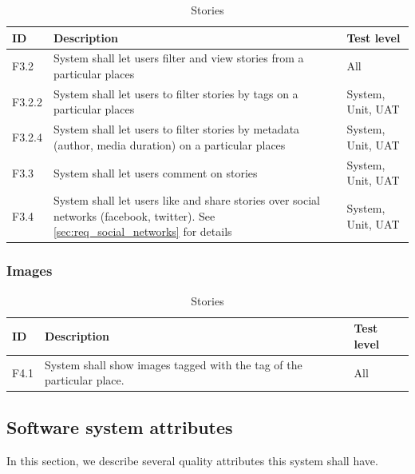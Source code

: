 \documentclass[11pt]{book}
\begin{document}
\begin{table}[H]
\centering
\begin{tabular}{ l  p{11cm} l }
    ID       & Description                                                                                              & Test level            \\ \hline
    F3.2     & System shall let users filter and view stories from a particular places                                  & All                   \\ \hline
    F3.2.2   & System shall let users to filter stories by tags on a particular places                                  & System, Unit, UAT     \\ \hline
    F3.2.4   & System shall let users to filter stories by metadata (author, media duration) on a particular places     & System, Unit, UAT     \\ \hline
    F3.3     & System shall let users comment on stories                                                                & System, Unit, UAT     \\ \hline
    F3.4     & System shall let users like and share stories over social networks (facebook, twitter). 
               See \ref{sec:req_social_networks} for details                                                            & System, Unit, UAT     \\
    \end{tabular}
\caption{Stories}
\label{tab:req_stories}
\end{table}

\subsubsection{Images}

\begin{table}[H]
\centering
\begin{tabular}{ l  p{11cm} l }
    ID       & Description                                                                                              & Test level            \\ \hline
    F4.1     & System shall show images tagged with the tag of the particular place.                                    & All                   \\
    \end{tabular}
\caption{Stories}
\label{tab:req_images}
\end{table}

\subsection{Software system attributes}\label{sec:req_software_system_attributes}
In this section, we describe several quality attributes this system shall have.
\end{document}
